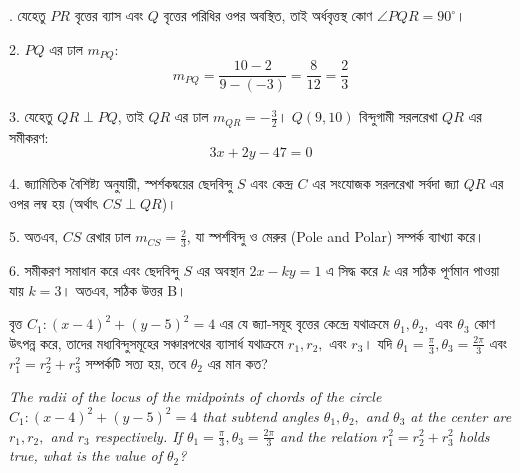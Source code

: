 \documentclass[12pt, a4paper]{article}
\begin{document}
\begin{tcolorbox}[solutionbox={সমাধান (Solution)}]
    . যেহেতু $PR$ বৃত্তের ব্যাস এবং $Q$ বৃত্তের পরিধির ওপর অবস্থিত, তাই অর্ধবৃত্তস্থ কোণ $\angle PQR = 90^{\circ}$।
    
    \vspace{0.5em}
    2. $PQ$ এর ঢাল $m_{PQ}$:
    \[ m_{PQ} = \frac{10 - 2}{9 - (-3)} = \frac{8}{12} = \frac{2}{3} \]
    
    3. যেহেতু $QR \perp PQ$, তাই $QR$ এর ঢাল $m_{QR} = -\frac{3}{2}$। $Q(9, 10)$ বিন্দুগামী সরলরেখা $QR$ এর সমীকরণ:
    \[ 3x + 2y - 47 = 0 \]
    
    4. জ্যামিতিক বৈশিষ্ট্য অনুযায়ী, স্পর্শকদ্বয়ের ছেদবিন্দু $S$ এবং কেন্দ্র $C$ এর সংযোজক সরলরেখা সর্বদা জ্যা $QR$ এর ওপর লম্ব হয় (অর্থাৎ $CS \perp QR$)।
    
    \vspace{0.5em}
    5. অতএব, $CS$ রেখার ঢাল $m_{CS} = \frac{2}{3}$, যা স্পর্শবিন্দু ও মেরুর (Pole and Polar) সম্পর্ক ব্যাখ্যা করে।
    
    6. সমীকরণ সমাধান করে এবং ছেদবিন্দু $S$ এর অবস্থান $2x - ky = 1$ এ সিদ্ধ করে $k$ এর সঠিক পূর্ণমান পাওয়া যায় $k = 3$। 
    অতএব, সঠিক উত্তর B।
\end{tcolorbox}

\begin{tcolorbox}[questionbox={প্রশ্ন (Question) 45}]
    \noindent
    বৃত্ত $C_1 : (x - 4)^2 + (y - 5)^2 = 4$ এর যে জ্যা-সমূহ বৃত্তের কেন্দ্রে যথাক্রমে $\theta_1, \theta_2,$ এবং $\theta_3$ কোণ উৎপন্ন করে, তাদের মধ্যবিন্দুসমূহের সঞ্চারপথের ব্যাসার্ধ যথাক্রমে $r_1, r_2,$ এবং $r_3$। যদি $\theta_1 = \frac{\pi}{3}, \theta_3 = \frac{2\pi}{3}$ এবং $r_1^2 = r_2^2 + r_3^2$ সম্পর্কটি সত্য হয়, তবে $\theta_2$ এর মান কত?
    
    \vspace{0.8em}
    \begin{english}
    \noindent\textit{\color{darkgray}
    The radii of the locus of the midpoints of chords of the circle $C_1 : (x - 4)^2 + (y - 5)^2 = 4$ that subtend angles $\theta_1, \theta_2,$ and $\theta_3$ at the center are $r_1, r_2,$ and $r_3$ respectively. If $\theta_1 = \frac{\pi}{3}, \theta_3 = \frac{2\pi}{3}$ and the relation $r_1^2 = r_2^2 + r_3^2$ holds true, what is the value of $\theta_2$?
    }
    \end{english}
\end{tcolorbox}
\end{document}
